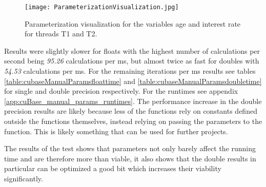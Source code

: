 \begin{figure}[h!]\centering
\texttt{[image: ParameterizationVisualization.jpg]}
\caption{Parameterization visualization for the variables age and interest rate for threads T1 and T2.\label{fig:ParameterizationVisualization}}
\end{figure}

Results were slightly slower for floats with the highest number of calculations per second being \emph{95.26} calculations per ms, but almost twice as fast for doubles with \emph{54.53} calculations per ms. 
For the remaining iterations per ms results see tables \ref{table:cubaseManualParamsfloattime} and \ref{table:cubaseManualParamsdoubletime} for single and double precision respectively.
For the runtimes see appendix \ref{app:cuBase_manual_params_runtimes}.
The performance increase in the double precision results are likely because less of the functions rely on constants defined outside the functions themselves, instead relying on passing the parameters to the function. %
This is likely something that can be used for further projects. %

The results of the test shows that parameters not only barely affect the running time and are therefore more than viable, it also shows that the double results in particular can be optimized a good bit which increases their viability significantly.

\begin{table}[h!]
\centering
{}
\caption{F\# Alea.cuBase calculations per ms with single precision and parameters\label{table:cubaseManualParamsfloattime}}
\end{table}


